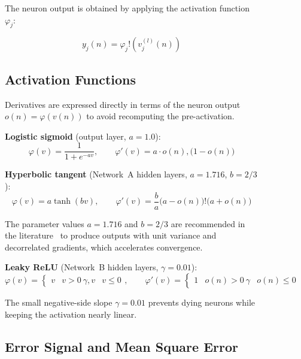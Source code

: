 \documentclass{acm_proc_article-sp} \usepackage{graphicx} \usepackage{amsmath} \usepackage{booktabs} \usepackage{url}
\begin{document}
\begin{figure}[ht]
{The neuron output is obtained by applying the activation function $\varphi_j$:

\begin{equation} y_j(n) = \varphi_j!\left(v^{(l)}_j(n)\right) \label{eq:neuron_output} \end{equation}

\subsection{Activation Functions}

Derivatives are expressed directly in terms of the neuron output $o(n) = \varphi(v(n))$ to avoid recomputing the pre-activation.

\textbf{Logistic sigmoid} (output layer, $a = 1.0$): \begin{equation} \varphi(v) = \frac{1}{1 + e^{-av}}, \qquad \varphi'(v) = a \cdot o(n),\bigl(1 - o(n)\bigr) \label{eq:logistic} \end{equation}

\textbf{Hyperbolic tangent} (Network~A hidden layers, $a = 1.716$, $b = 2/3$): \begin{equation} \varphi(v) = a\tanh(bv), \qquad \varphi'(v) = \frac{b}{a}\bigl(a - o(n)\bigr)!\bigl(a + o(n)\bigr) \label{eq:tanh} \end{equation}

The parameter values $a = 1.716$ and $b = 2/3$ are recommended in the literature~\cite{lecun1998efficient} to produce outputs with unit variance and decorrelated gradients, which accelerates convergence.

\textbf{Leaky ReLU} (Network~B hidden layers, $\gamma = 0.01$): \begin{equation} \varphi(v) = \begin{cases} v & v > 0 \ \gamma,v & v \leq 0 \end{cases}, \qquad \varphi'(v) = \begin{cases} 1 & o(n) > 0 \ \gamma & o(n) \leq 0 \end{cases} \label{eq:lrelu} \end{equation}

The small negative-side slope $\gamma = 0.01$ prevents dying neurons while keeping the activation nearly linear.

\subsection{Error Signal and Mean Square Error}

}
\end{figure}
\end{document}
